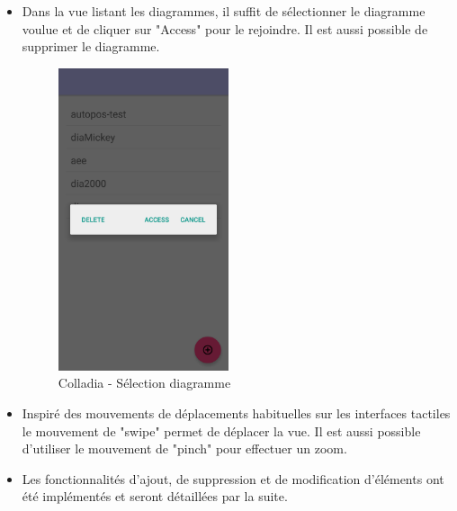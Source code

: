 \begin{itemize}
		\item Dans la vue listant les diagrammes, il suffit de sélectionner le diagramme voulue et de cliquer sur "Access" pour le rejoindre. Il est aussi possible de supprimer le diagramme.
		\begin{figure}[!h]
			\centering
			\includegraphics[width=5cm]{img/screen/colladia_workspaces_select}
			\caption{Colladia - Sélection diagramme}
		\end{figure}
		
		\item Inspiré des mouvements de déplacements habituelles sur les interfaces tactiles le mouvement de "swipe" permet de déplacer la vue. Il est aussi possible d'utiliser le mouvement de "pinch" pour effectuer un zoom.
		
		\item Les fonctionnalités d'ajout, de suppression et de modification d'éléments ont été implémentés et seront détaillées par la suite.
	\end{itemize}
	
	

